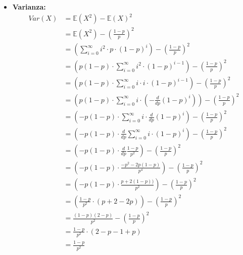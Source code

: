 \documentclass[11pt]{report}
\begin{document}
\begin{itemize}
    \item \textbf{Varianza:}
    \begin{equation}
    	\begin{split}
   			Var(X) & = \mathbb{E}(X^2) - \mathbb{E}(X)^2\\
            & = \mathbb{E}(X^2) - \left(\frac{1-p}{p}\right)^2\\
            & = \left( \sum_{i=0}^\infty i^2 \cdot p \cdot (1-p)^i \right) - \left(\frac{1-p}{p}\right)^2\\
            & = \left( p(1-p) \cdot \sum_{i=0}^\infty i^2 \cdot (1-p)^{i-1} \right) - \left(\frac{1-p}{p}\right)^2\\
            & = \left( p(1-p) \cdot \sum_{i=0}^\infty i \cdot i \cdot (1-p)^{i-1} \right) - \left(\frac{1-p}{p}\right)^2\\
            & = \left( p(1-p) \cdot \sum_{i=0}^\infty i \cdot \left( -\frac{d}{dp}(1-p)^i \right) \right) - \left(\frac{1-p}{p}\right)^2\\
            & = \left( -p(1-p) \cdot \sum_{i=0}^\infty i \cdot \frac{d}{dp}(1-p)^i \right) - \left(\frac{1-p}{p}\right)^2\\
            & = \left( -p(1-p) \cdot \frac{d}{dp} \sum_{i=0}^\infty i \cdot (1-p)^i \right) - \left(\frac{1-p}{p}\right)^2\\
            & = \left( -p(1-p) \cdot \frac{d}{dp} \frac{1-p}{p^2} \right) - \left(\frac{1-p}{p}\right)^2\\
            & = \left( -p(1-p) \cdot \frac{-p^2 - 2p(1-p)}{p^4} \right) - \left(\frac{1-p}{p}\right)^2\\
            & = \left( -p(1-p) \cdot \frac{p+2(1-p))}{p^2} \right) - \left(\frac{1-p}{p}\right)^2\\
            & = \left( \frac{1-p}{p^2} \cdot (p+2-2p) \right) - \left(\frac{1-p}{p}\right)^2\\
            & = \frac{(1-p)(2-p)}{p^2} - \left(\frac{1-p}{p}\right)^2\\
            & = \frac{1-p}{p^2} \cdot (2-p-1+p)\\
            & = \frac{1-p}{p^2}
		\end{split}
    \end{equation}
\end{itemize}
\begin{center}
    
\end{center}
\begin{center}
    
\end{center}
\end{document}
